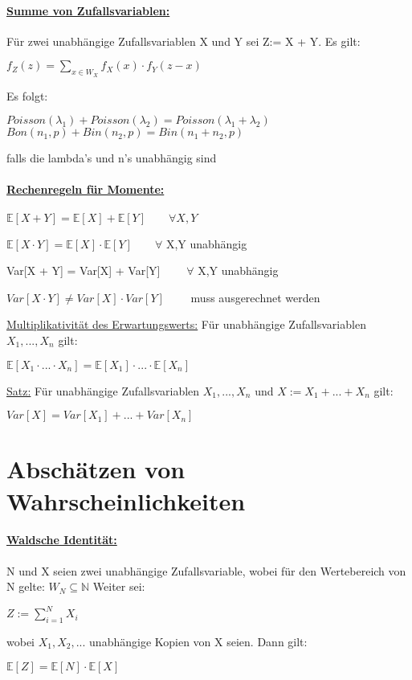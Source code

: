 \documentclass[8pt]{extreport}
\begin{document}
\paragraph{\underline{Summe von Zufallsvariablen:}} Für zwei unabhängige Zufallsvariablen X und Y sei Z:= X + Y. Es gilt:
\begin{center}
$f_Z(z) = \displaystyle\sum_{x \in W_X}f_X(x) \cdot f_Y(z-x)$
\end{center}
Es folgt:
\begin{center}
$Poisson(\lambda_1) + Poisson(\lambda_2) = Poisson(\lambda_1 + \lambda_2)$
$Bon(n_1,p) + Bin(n_2,p) = Bin(n_1 + n_2, p)$
\end{center}
falls die lambda's und n's unabhängig sind
\paragraph{\underline{Rechenregeln für Momente:}}
\begin{center}
\item $\mathbb{E}[X + Y] = \mathbb{E}[X] + \mathbb{E}[Y] \qquad \forall X,Y$ 
\item $\mathbb{E}[X \cdot Y] = \mathbb{E}[X] \cdot \mathbb{E}[Y] \qquad \forall$ X,Y unabhängig
\item Var[X + Y] = Var[X] + Var[Y]	 $\qquad \forall$ X,Y unabhängig
\item $Var[X \cdot Y] \neq Var[X] \cdot Var[Y] \qquad$ muss ausgerechnet werden 
\end{center}
\underline{Multiplikativität des Erwartungswerts:} Für unabhängige Zufallsvariablen $X_1,...,X_n$ gilt:
\begin{center}
$\mathbb{E}[X_1 \cdot ... \cdot X_n] = \mathbb{E}[X_1] \cdot ... \cdot \mathbb{E}[X_n]$
\end{center}
\underline{Satz:} Für unabhängige Zufallsvariablen $X_1,...,X_n$ und $X:= X_1 + ... + X_n$ gilt:
\begin{center}
$Var[X] = Var[X_1] + ... + Var[X_n]$
\end{center}
\section{Abschätzen von Wahrscheinlichkeiten}
\paragraph{\underline{Waldsche Identität:}} N und X seien zwei unabhängige Zufallsvariable, wobei für den Wertebereich von N gelte: $W_N \subseteq \mathbb{N}$ Weiter sei:
\begin{center}
$Z:= \displaystyle\sum_{i=1}^{N}X_i$
\end{center}
wobei $X_1,X_2,...$ unabhängige Kopien von X seien. Dann gilt:
\begin{center}
$\mathbb{E}[Z] = \mathbb{E}[N] \cdot \mathbb{E}[X]$
\end{center}
\end{document}
